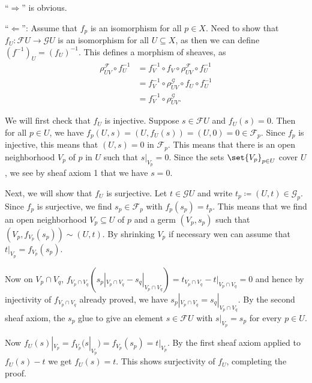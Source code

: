\enquote{$\Longrightarrow$} is obvious.

\enquote{$\Longleftarrow$}: Assume that $f_p$ is an isomorphism for all
$p \in X$. Need to show that $f_U\colon \mathcal{F}U \to \mathcal{G}U$ is an
isomorphism for all $U \subseteq X$, as then we can define $(f^{-1})_U = (f_U)^{-1}$.
This defines a morphism of sheaves, as
\begin{align*}
	\rho_{UV}^{\mathcal{F}}\circ f_U^{-1} &= f_V^{-1}\circ f_V \circ \rho_{UV}^{\mathcal{F}} \circ f_U^{-1}\\
	&= f_V^{-1} \circ \rho_{UV}^{\mathcal{G}}\circ f_U \circ f_U^{-1}\\
	&= f_V^{-1} \circ \rho_{UV}^{\mathcal{G}}.
\end{align*}

We will first check that $f_U$ is injective. Suppose $s \in \mathcal{F}U$ and
$f_U(s) = 0$. Then for all $p \in U$, we have $f_p(U, s) = (U, f_U(s)) = (U, 0) = 0 \in \mathcal{F}_p$.
Since $f_p$ is injective, this means that $(U, s) = 0$ in $\mathcal{F}_p$. This
means that there is an open neighborhood $V_p$ of $p$ in $U$ such that
$s|_{V_p} = 0$. Since the sets $\set{V_p}_{p \in U}$ cover $U$, we see by
sheaf axiom 1 that we have $s = 0$.

Next, we will show that $f_U$ is surjective. Let $t \in \mathcal{G}U$ and write
$t_p\coloneqq (U, t) \in \mathcal{G}_p$. Since $f_p$ is surjective, we find $s_p \in \mathcal{F}_p$
with $f_p(s_p) = t_p$. This means that we find an open neighborhood $V_p \subseteq U$ of $p$
and a germ $(V_p, s_p)$ such that $(V_p, f_{V_p}(s_p)) \sim (U, t)$. By
shrinking $V_p$ if necessary wen can assume that $t|_{V_p} = f_{V_p}(s_p)$.

Now on $V_p\cap V_q$, $f_{V_p\cap V_q}(s_p|_{V_p\cap V_q} - s_q|_{V_p\cap V_q}) = t_{V_p\cap V_q} - t|_{V_p\cap V_q} = 0$
and hence by injectivity of $f_{V_p\cap V_q}$ already proved, we have $s_p|_{V_p\cap V_q} = s_q|_{V_p\cap V_q}$.
By the second sheaf axiom, the $s_p$ glue to give an element $s \in \mathcal{F}U$ with
$s|_{V_p} = s_p$ for every $p \in U$.

Now $f_U(s)|_{V_p} = f_{V_p}(s|_{V_p}) = f_{V_p}(s_p) = t|_{V_p}$.
By the first sheaf axiom applied to $f_U(s) - t$ we get $f_U(s) = t$. This shows
surjectivity of $f_U$, completing the proof.
